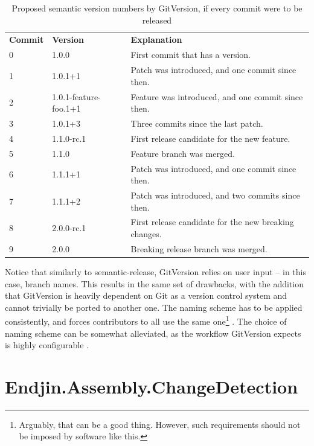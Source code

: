 \documentclass{l4proj}
\begin{document}
\begin{table}[H]
\centering
\begin{tabular}{|l|l|l|}
\textbf{Commit} & \textbf{Version} & \textbf{Explanation}                              \\
0      & 1.0.0                 & First commit that has a version.                      \\
1      & 1.0.1+1               & Patch was introduced, and one commit since then.      \\
2      & 1.0.1-feature-foo.1+1 & Feature was introduced, and one commit since then.    \\
3      & 1.0.1+3               & Three commits since the last patch.                   \\
4      & 1.1.0-rc.1            & First release candidate for the new feature.          \\
5      & 1.1.0                 & Feature branch was merged.                            \\
6      & 1.1.1+1               & Patch was introduced, and one commit since then.      \\
7      & 1.1.1+2               & Patch was introduced, and two commits since then.     \\
8      & 2.0.0-rc.1            & First release candidate for the new breaking changes. \\
9      & 2.0.0                 & Breaking release branch was merged.
\end{tabular}
\caption{Proposed semantic version numbers by GitVersion, if every
commit were to be released}
\end{table}

Notice that similarly to semantic-release, GitVersion relies on user
input -- in this case, branch names. This results in the same set of
drawbacks, with the addition that GitVersion is heavily dependent on
Git as a version control system and cannot trivially be ported to
another one. The naming scheme has to be applied consistently, and
forces contributors to all use the same one\footnote{Arguably, that
can be a good thing. However, such requirements should not be imposed
by software like this.} . The choice of naming scheme can be somewhat
alleviated, as the workflow GitVersion expects is highly configurable
\cite{GitVersionConfiguration}.

\section{Endjin.Assembly.ChangeDetection}
\end{document}
